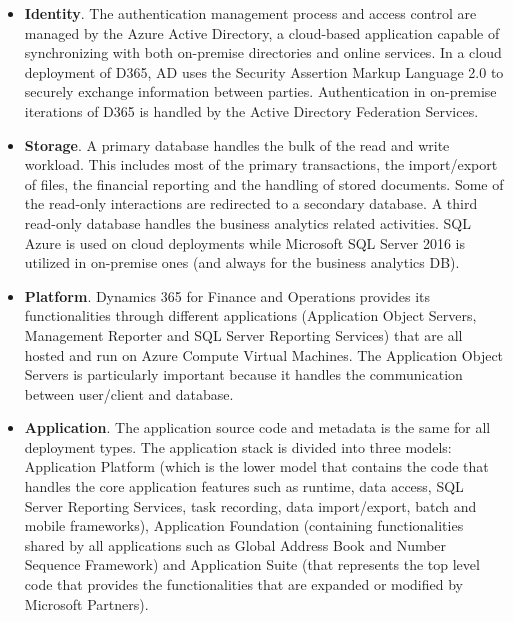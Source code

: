 \enlargethispage{-\baselineskip}
\enlargethispage{-\baselineskip}

\begin{itemize}
    \item \textbf{Identity}. The authentication management process and access control are managed by the Azure Active Directory, a cloud-based application capable of synchronizing with both on-premise directories and online services. In a cloud deployment of D365, AD uses the Security Assertion Markup Language 2.0 to securely exchange information between parties. Authentication in on-premise iterations of D365 is handled by the Active Directory Federation Services.
    
    \item \textbf{Storage}. A primary database handles the bulk of the read and write workload. This includes most of the primary transactions, the import/export of files, the financial reporting and the handling of stored documents. Some of the read-only interactions are redirected to a secondary database. A third read-only database handles the business analytics related activities. SQL Azure is used on cloud deployments while Microsoft SQL Server 2016 is utilized in on-premise ones (and always for the business analytics DB).
    
    \item \textbf{Platform}. Dynamics 365 for Finance and Operations provides its functionalities through different applications (Application Object Servers, Management Reporter and SQL Server Reporting Services) that are all hosted and run on Azure Compute Virtual Machines. The Application Object Servers is particularly important because it handles the communication between user/client and database.
    
    \item \textbf{Application}. The application source code and metadata is the same for all deployment types. The application stack is divided into three models: Application Platform (which is the lower model that contains the code that handles the core application features such as runtime, data access, SQL Server Reporting Services, task recording, data import/export, batch and mobile frameworks), Application Foundation (containing functionalities shared by all applications such as Global Address Book and Number Sequence Framework) and Application Suite (that represents the top level code that provides the functionalities that are expanded or modified by Microsoft Partners).
        

\end{itemize}
